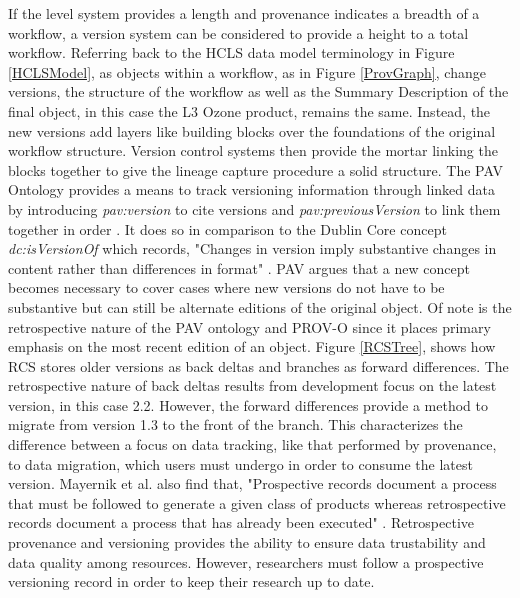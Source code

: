 If the level system provides a length and provenance indicates a breadth of a workflow, a version system can be considered to provide a height to a total workflow.
Referring back to the HCLS data model terminology in Figure \ref{HCLSModel}, as objects within a workflow, as in Figure \ref{ProvGraph}, change versions, the structure of the workflow as well as the Summary Description of the final object, in this case the L3 Ozone product, remains the same.
Instead, the new versions add layers like building blocks over the foundations of the original workflow structure.
Version control systems then provide the mortar linking the blocks together to give the lineage capture procedure a solid structure.
The PAV Ontology provides a means to track versioning information through linked data by introducing \textit{pav:version} to cite versions and \textit{pav:previousVersion} to link them together in order \cite{Ciccarese2013}.
It does so in comparison to the Dublin Core concept \textit{dc:isVersionOf} which records, "Changes in version imply substantive changes in content rather than differences in format" \cite{DCMI2012}.
PAV argues that a new concept becomes necessary to cover cases where new versions do not have to be substantive but can still be alternate editions of the original object.
Of note is the retrospective nature of the PAV ontology and PROV-O since it places primary emphasis on the most recent edition of an object.
Figure \ref{RCSTree}, shows how RCS stores older versions as back deltas and branches as forward differences.
The retrospective nature of back deltas results from development focus on the latest version, in this case 2.2.
However, the forward differences provide a method to migrate from version 1.3 to the front of the branch.
This characterizes the difference between a focus on data tracking, like that performed by provenance, to data migration, which users must undergo in order to consume the latest version.
Mayernik et al. also find that, "Prospective records document a process that must be followed to generate a given class of products whereas retrospective records document a process that has already been executed" \cite{MatthewS.Mayernik201312-039}.
Retrospective provenance and versioning provides the ability to ensure data trustability and data quality among resources.
However, researchers must follow a prospective versioning record in order to keep their research up to date.



